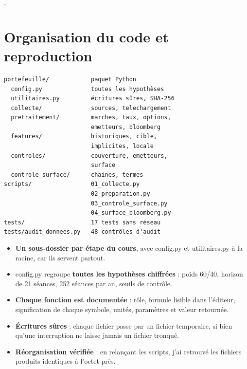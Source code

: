 \documentclass[10pt,a4paper]{article}
\makeatletter
\newcommand{\besoin}[1]{\par\penalty-100\begingroup\setlength{\dimen@}{#1}%
  \dimen@ii\pagegoal\advance\dimen@ii-\pagetotal
  \ifdim\dimen@>\dimen@ii\ifdim\dimen@ii>\z@\vfil\fi\break\fi\endgroup}
\let\sectionorigine\section
\renewcommand{\section}{\besoin{6\baselineskip}\sectionorigine}
\newcommand{\coupure}{\textunderscore\allowbreak}
\newcommand{\fic}[1]{{\small\ttfamily\let\_\coupure #1}}
\makeatother
\begin{document}
\section{Organisation du code et reproduction}
\begin{minipage}[t]{0.5\linewidth}\vspace{0pt}
\begin{tcolorbox}[enhanced,colback=gris,colframe=gris,arc=2pt,left=5pt,right=3pt,top=2pt,bottom=2pt,fontupper=\footnotesize]
\begin{verbatim}
portefeuille/            paquet Python
  config.py              toutes les hypothèses
  utilitaires.py         écritures sûres, SHA-256
  collecte/              sources, telechargement
  pretraitement/         marches, taux, options,
                         emetteurs, bloomberg
  features/              historiques, cible,
                         implicites, locale
  controles/             couverture, emetteurs,
                         surface
  controle_surface/      chaines, termes
scripts/                 01_collecte.py
                         02_preparation.py
                         03_controle_surface.py
                         04_surface_bloomberg.py
tests/                   17 tests sans réseau
tests/audit_donnees.py   48 contrôles d'audit
\end{verbatim}
\end{tcolorbox}
\end{minipage}\hfill
\begin{minipage}[t]{0.47\linewidth}\vspace{2pt}
\begin{itemize}
\item \textbf{Un sous-dossier par étape du cours}, avec \fic{config.py} et \fic{utilitaires.py} à la racine, car ils servent partout.
\item \fic{config.py} regroupe \textbf{toutes les hypothèses chiffrées} : poids 60/40, horizon de 21 séances, 252 séances par an, seuils de contrôle.
\item \textbf{Chaque fonction est documentée} : rôle, formule lisible dans l'éditeur, signification de chaque symbole, unités, paramètres et valeur retournée.
\item \textbf{Écritures sûres} : chaque fichier passe par un fichier temporaire, si bien qu'une interruption ne laisse jamais un fichier tronqué.
\item \textbf{Réorganisation vérifiée} : en relançant les scripts, j'ai retrouvé les fichiers produits identiques à l'octet près.
\end{itemize}
\end{minipage}
\end{document}
